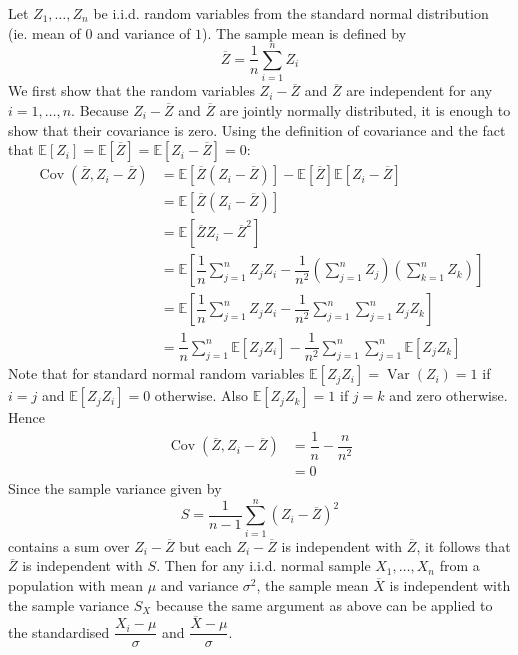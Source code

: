 \documentclass[11pt]{report} %
\begin{document}
Let $Z_{1}, \dots, Z_{n}$ be i.i.d. random variables from the standard normal distribution (ie. mean of $0$ and variance of $1$). The sample mean is defined by
\begin{equation}
\overline{Z} = \dfrac{1}{n}\sum_{i = 1}^{n}Z_{i}
\end{equation}
We first show that the random variables $Z_{i} - \overline{Z}$ and $\overline{Z}$ are independent for any $i = 1, \dots, n$. Because $Z_{i} - \overline{Z}$ and $\overline{Z}$ are jointly normally distributed, it is enough to show that their covariance is zero. Using the definition of covariance and the fact that $\mathbb{E}\left[Z_{i}\right] = \mathbb{E}\left[\overline{Z}\right] = \mathbb{E}\left[Z_{i} - \overline{Z}\right] = 0$:
\begin{align}
\operatorname{Cov}\left(\overline{Z}, Z_{i} - \overline{Z}\right) &= \mathbb{E}\left[\overline{Z}\left(Z_{i} - \overline{Z}\right)\right] - \mathbb{E}\left[\overline{Z}\right]\mathbb{E}\left[Z_{i} - \overline{Z}\right] \\
&= \mathbb{E}\left[\overline{Z}\left(Z_{i} - \overline{Z}\right)\right] \\
&= \mathbb{E}\left[\overline{Z}Z_{i} - \overline{Z}^{2}\right] \\
&= \mathbb{E}\left[\dfrac{1}{n}\sum_{j = 1}^{n}Z_{j}Z_{i} - \dfrac{1}{n^{2}}\left(\sum_{j = 1}^{n}Z_{j}\right)\left(\sum_{k = 1}^{n}Z_{k}\right)\right] \\
&= \mathbb{E}\left[\dfrac{1}{n}\sum_{j = 1}^{n}Z_{j}Z_{i} - \dfrac{1}{n^{2}}\sum_{j = 1}^{n}\sum_{j = 1}^{n}Z_{j}Z_{k}\right] \\
&= \dfrac{1}{n}\sum_{j = 1}^{n}\mathbb{E}\left[Z_{j}Z_{i}\right] - \dfrac{1}{n^{2}}\sum_{j = 1}^{n}\sum_{j = 1}^{n}\mathbb{E}\left[Z_{j}Z_{k}\right]
\end{align}
Note that for standard normal random variables $\mathbb{E}\left[Z_{j}Z_{i}\right] = \operatorname{Var}\left(Z_{i}\right) = 1$ if $i = j$ and $\mathbb{E}\left[Z_{j}Z_{i}\right] = 0$ otherwise. Also $\mathbb{E}\left[Z_{j}Z_{k}\right] = 1$ if $j = k$ and zero otherwise. Hence
\begin{align}
\operatorname{Cov}\left(\overline{Z}, Z_{i} - \overline{Z}\right) &= \dfrac{1}{n} - \dfrac{n}{n^{2}} \\
&= 0
\end{align}
Since the sample variance given by
\begin{equation}
S = \frac{1}{n - 1}\sum_{i = 1}^{n}\left(Z_{i} - \overline{Z}\right)^{2}
\end{equation}
contains a sum over $Z_{i} - \overline{Z}$ but each $Z_{i} - \overline{Z}$ is independent with $\overline{Z}$, it follows that $\overline{Z}$ is independent with $S$. Then for any i.i.d. normal sample $X_{1}, \dots, X_{n}$ from a population with mean $\mu$ and variance $\sigma^{2}$, the sample mean $\overline{X}$ is independent with the sample variance $S_{X}$ because the same argument as above can be applied to the standardised $\dfrac{X_{i} - \mu}{\sigma}$ and $\dfrac{\overline{X} - \mu}{\sigma}$.
\end{document}
